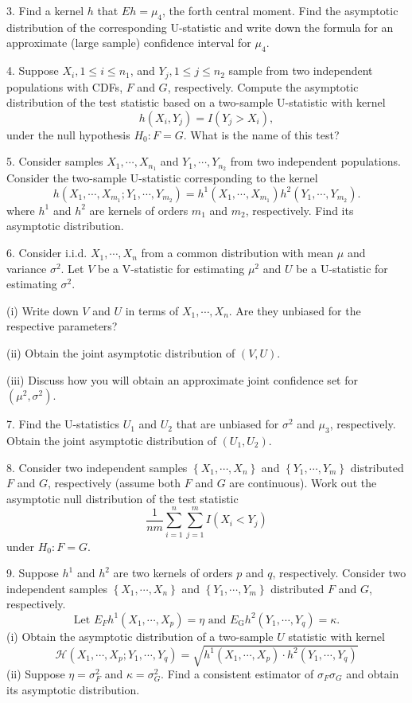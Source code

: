 \documentclass[11pt]{article}
\theoremstyle{definition}
\begin{document}
3. Find a kernel $h$ that $E h=\mu_4$, the forth central moment. Find the asymptotic distribution of the corresponding U-statistic and write down the formula for an approximate (large sample) confidence interval for $\mu_4$.

4. Suppose $X_i, 1 \leq i \leq n_1$, and $Y_j, 1 \leq j \leq n_2$ sample from two independent populations with CDFs, $F$ and $G$, respectively. Compute the asymptotic distribution of the test statistic based on a two-sample U-statistic with kernel
$$
h\left(X_i, Y_j\right)=I\left(Y_j>X_i\right),
$$
under the null hypothesis $H_0: F=G$.
What is the name of this test?

5. Consider samples $X_1, \cdots, X_{n_1}$ and $Y_1, \cdots, Y_{n_2}$ from two independent populations. Consider the two-sample U-statistic corresponding to the kernel
$$
h\left(X_1, \cdots, X_{m_1} ; Y_1, \cdots, Y_{m_2}\right)=h^1\left(X_1, \cdots, X_{m_1}\right) h^2\left(Y_1, \cdots, Y_{m_2}\right) .
$$
where $h^1$ and $h^2$ are kernels of orders $m_1$ and $m_2$, respectively. Find its asymptotic distribution.

6. Consider i.i.d. $X_1, \cdots, X_n$ from a common distribution with mean $\mu$ and variance $\sigma^2$. Let $V$ be a V-statistic for estimating $\mu^2$ and $U$ be a U-statistic for estimating $\sigma^2$.

(i) Write down $V$ and $U$ in terms of $X_1, \cdots, X_n$. Are they unbiased for the respective parameters?

(ii) Obtain the joint asymptotic distribution of $(V, U)$.

(iii) Discuss how you will obtain an approximate joint confidence set for $\left(\mu^2, \sigma^2\right)$.\


7. Find the U-statistics $U_1$ and $U_2$ that are unbiased for $\sigma^2$ and $\mu_3$, respectively. Obtain the joint asymptotic distribution of $\left(U_1, U_2\right)$.

8. Consider two independent samples $\left\{X_1, \cdots, X_n\right\}$ and $\left\{Y_1, \cdots, Y_m\right\}$ distributed $F$ and $G$, respectively (assume both $F$ and $G$ are continuous). Work out the asymptotic null distribution of the test statistic
$$
\frac{1}{n m} \sum_{i=1}^n \sum_{j=1}^m I\left(X_i<Y_j\right)
$$
under $H_0: F=G$.

9. Suppose $h^{1}$ and $h^{2}$ are two kernels of orders $p$ and $q$, respectively. Consider two independent samples $\left\{X_{1}, \cdots, X_{n}\right\}$ and $\left\{Y_{1}, \cdots, Y_{m}\right\}$ distributed $F$ and $G$, respectively.
$$
\text { Let } E_{F} h^{1}\left(X_{1}, \cdots, X_{p}\right)=\eta \text { and } E_{\mathrm{G}} h^{2}\left(Y_{1}, \cdots, Y_{q}\right)=\kappa \text {. }
$$
(i) Obtain the asymptotic distribution of a two-sample $U$ statistic with kernel
$$
\mathcal{H}\left(X_{1}, \cdots, X_{p} ; Y_{1}, \cdots, Y_{q}\right)=\sqrt{h^{1}\left(X_{1}, \cdots, X_{p}\right) \cdot h^{2}\left(Y_{1}, \cdots, Y_{q}\right)}
$$
(ii) Suppose $\eta=\sigma_{F}^{2}$ and $\kappa=\sigma_{G}^{2}$. Find a consistent estimator of $\sigma_{F} \sigma_{G}$ and obtain its asymptotic distribution.
\end{document}
